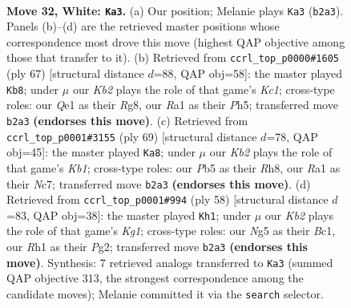 \documentclass[11pt]{article}
\begin{document}
\clearpage

\begin{figure}[p]\centering
\begin{subfigure}{0.46\textwidth}\centering
\resizebox{\linewidth}{!}{%
\newchessgame
\chessboard[
  setfen={r1r5/n3k3/1p2p3/pP3pN1/5n1p/7P/PKq3P1/R3Q2R w - - 6 32},
  showmover=false,
  pgfstyle=straightmove, color=movearrow, markmove={b2-a3}
]}
\caption{}
\end{subfigure}\hfill
\begin{subfigure}{0.46\textwidth}\centering
\resizebox{\linewidth}{!}{%
\newchessgame
\chessboard[
  setfen={2k3rr/2p2p2/Q3p3/4P2p/4PN2/1P6/P1q3PP/5RK1 b - - 3 34},
  showmover=false,
  pgfstyle=straightmove, color=movearrow, markmove={c8-b8}
]}
\caption{}
\end{subfigure}
\\[4pt]
\begin{subfigure}{0.46\textwidth}\centering
\resizebox{\linewidth}{!}{%
\newchessgame
\chessboard[
  setfen={1k1r3r/1pnN1pp1/p7/1P1pP3/8/1q6/1P3QP1/1K2R2R b - - 3 35},
  showmover=false,
  pgfstyle=straightmove, color=movearrow, markmove={b8-a8}
]}
\caption{}
\end{subfigure}\hfill
\begin{subfigure}{0.46\textwidth}\centering
\resizebox{\linewidth}{!}{%
\newchessgame
\chessboard[
  setfen={r1r3k1/p3Rpp1/1q1p3p/8/5pQ1/1Pn5/P1P3PP/2B1R1K1 w - - 2 30},
  showmover=false,
  pgfstyle=straightmove, color=movearrow, markmove={g1-h1}
]}
\caption{}
\end{subfigure}
\caption{\textbf{Move 32, White: \texttt{Ka3}.} (a) Our position; Melanie plays \texttt{Ka3} (\texttt{b2a3}). Panels (b)--(d) are the retrieved master positions whose correspondence most drove this move (highest QAP objective among those that transfer to it). (b) Retrieved from \texttt{ccrl\_top\_p0000\#1605} (ply 67) [structural distance $d$=88, QAP obj=58]: the master played \texttt{Kb8}; under $\mu$ our \emph{Kb2} plays the role of that game's \emph{Kc1}; cross-type roles: our \emph{Q}e1 as their \emph{R}g8, our \emph{R}a1 as their \emph{P}h5; transferred move \texttt{b2a3} \textbf{(endorses this move)}. (c) Retrieved from \texttt{ccrl\_top\_p0001\#3155} (ply 69) [structural distance $d$=78, QAP obj=45]: the master played \texttt{Ka8}; under $\mu$ our \emph{Kb2} plays the role of that game's \emph{Kb1}; cross-type roles: our \emph{P}b5 as their \emph{R}h8, our \emph{R}a1 as their \emph{N}c7; transferred move \texttt{b2a3} \textbf{(endorses this move)}. (d) Retrieved from \texttt{ccrl\_top\_p0001\#994} (ply 58) [structural distance $d$=83, QAP obj=38]: the master played \texttt{Kh1}; under $\mu$ our \emph{Kb2} plays the role of that game's \emph{Kg1}; cross-type roles: our \emph{N}g5 as their \emph{B}c1, our \emph{R}h1 as their \emph{P}g2; transferred move \texttt{b2a3} \textbf{(endorses this move)}. Synthesis: 7 retrieved analogs transferred to \texttt{Ka3} (summed QAP objective 313, the strongest correspondence among the candidate moves); Melanie committed it via the \texttt{search} selector.}
\label{fig:thought-m62}
\end{figure}
\end{document}
